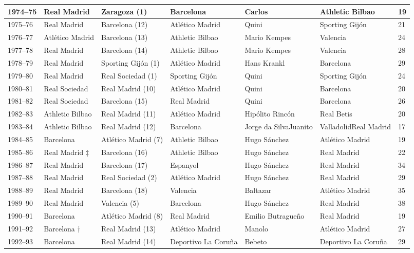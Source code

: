 \documentclass[]{tufte-handout}
\begin{document}
\begin{table}
\begin{tabular}{l|l|l|l|l|l|l}
\hline
1974–75 & Real Madrid & Zaragoza (1) & Barcelona & Carlos & Athletic Bilbao & 19\\
\hline
1975–76 & Real Madrid & Barcelona (12) & Atlético Madrid & Quini & Sporting Gijón & 21\\
\hline
1976–77 & Atlético Madrid & Barcelona (13) & Athletic Bilbao & Mario Kempes & Valencia & 24\\
\hline
1977–78 & Real Madrid & Barcelona (14) & Athletic Bilbao & Mario Kempes & Valencia & 28\\
\hline
1978–79 & Real Madrid & Sporting Gijón (1) & Atlético Madrid & Hans Krankl & Barcelona & 29\\
\hline
1979–80 & Real Madrid & Real Sociedad (1) & Sporting Gijón & Quini & Sporting Gijón & 24\\
\hline
1980–81 & Real Sociedad & Real Madrid (10) & Atlético Madrid & Quini & Barcelona & 20\\
\hline
1981–82 & Real Sociedad & Barcelona (15) & Real Madrid & Quini & Barcelona & 26\\
\hline
1982–83 & Athletic Bilbao & Real Madrid (11) & Atlético Madrid & Hipólito Rincón & Real Betis & 20\\
\hline
1983–84 & Athletic Bilbao & Real Madrid (12) & Barcelona & Jorge da SilvaJuanito & ValladolidReal Madrid & 17\\
\hline
1984–85 & Barcelona & Atlético Madrid (7) & Athletic Bilbao & Hugo Sánchez & Atlético Madrid & 19\\
\hline
1985–86 & Real Madrid  ‡ & Barcelona (16) & Athletic Bilbao & Hugo Sánchez & Real Madrid & 22\\
\hline
1986–87 & Real Madrid & Barcelona (17) & Espanyol & Hugo Sánchez & Real Madrid & 34\\
\hline
1987–88 & Real Madrid & Real Sociedad (2) & Atlético Madrid & Hugo Sánchez & Real Madrid & 29\\
\hline
1988–89 & Real Madrid & Barcelona (18) & Valencia & Baltazar & Atlético Madrid & 35\\
\hline
1989–90 & Real Madrid & Valencia (5) & Barcelona & Hugo Sánchez & Real Madrid & 38\\
\hline
1990–91 & Barcelona & Atlético Madrid (8) & Real Madrid & Emilio Butragueño & Real Madrid & 19\\
\hline
1991–92 & Barcelona  † & Real Madrid (13) & Atlético Madrid & Manolo & Atlético Madrid & 27\\
\hline
1992–93 & Barcelona & Real Madrid (14) & Deportivo La Coruña & Bebeto & Deportivo La Coruña & 29\\

\end{tabular}
\end{table}
\end{document}
